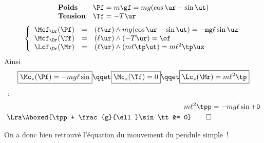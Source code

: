 \documentclass[../main/main.tex]{subfiles}
\begin{document}
\begin{enumerate}[label=\sqenumi, start=4]
        \[
            \begin{array}{ll}
                \textbf{Poids} & \Pf = m\gf = mg(\cos\tt \ur - \sin\tt \ut)\\
                \textbf{Tension} & \Tf = -T\ur
            \end{array}
        \]
        \[
            \left\{
                \begin{array}{rcl}
                    \Mcf_{\Or}(\Pf) & = & (\ell\ur)\wedge mg(\cos\tt \ur - \sin\tt \ut)
                                        = -mg\ell\sin\tt\uz\\
                    \Mcf_{\Or}(\Tf) & = & (\ell\ur)\wedge(-T\ur) = \of\\
                    \Lcf_{\Or}(\Mr) & = & (\ell\ur)\wedge(m\ell\tp\ut) =
                    m\ell^2\tp\uz
                \end{array}
            \right.
        \]
        Ainsi
        \[
            \boxed{\Mc_z(\Pf) = -mg\ell\sin\tt}
            \qqet
            \boxed{\Mc_z(\Tf) = 0}
            \qqet
            \boxed{\Lc_z(\Mr) = m\ell^2\tp}
        \]
    ~:
    \begin{align*}
        m\ell^2\tpp &= -mg\ell\sin\tt + 0
        \\\Lra
        \Aboxed{\tpp + \frac{g}{\ell}\sin\tt &= 0}
        \qed
    \end{align*}
\end{enumerate}
On a donc bien retrouvé l'équation du mouvement du pendule simple~!
\end{document}
